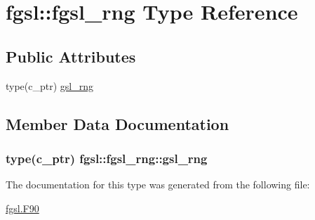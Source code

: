 \hypertarget{structfgsl_1_1fgsl__rng}{\section{fgsl\-:\-:fgsl\-\_\-rng Type Reference}
\label{structfgsl_1_1fgsl__rng}
}
\subsection*{Public Attributes}
\begin{DoxyCompactItemize}
\item 
type(c\-\_\-ptr) \hyperlink{structfgsl_1_1fgsl__rng_a4b9983fa868bf2f9d49799977fb8df32}{gsl\-\_\-rng}
\end{DoxyCompactItemize}


\subsection{Member Data Documentation}
\hypertarget{structfgsl_1_1fgsl__rng_a4b9983fa868bf2f9d49799977fb8df32}{
\subsubsection[{gsl\-\_\-rng}]{\setlength{\rightskip}{0pt plus 5cm}type(c\-\_\-ptr) fgsl\-::fgsl\-\_\-rng\-::gsl\-\_\-rng}}\label{structfgsl_1_1fgsl__rng_a4b9983fa868bf2f9d49799977fb8df32}


The documentation for this type was generated from the following file\-:\begin{DoxyCompactItemize}
\item 
\hyperlink{fgsl_8F90}{fgsl.\-F90}\end{DoxyCompactItemize}
